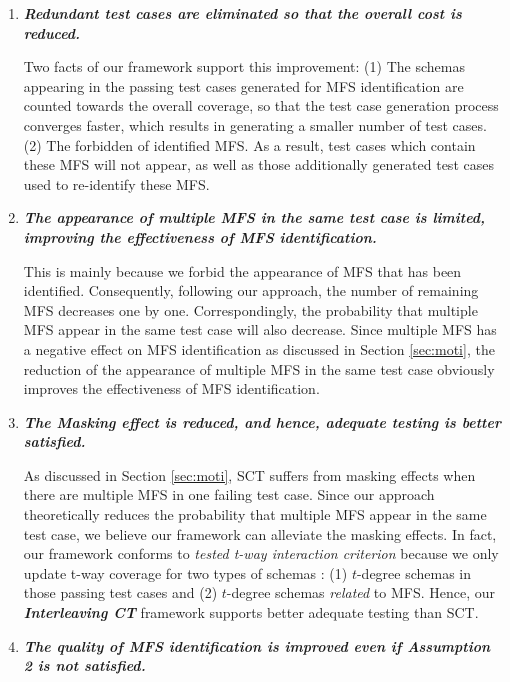 \documentclass[journal,12pt,onecolumn,draftclsnofoot,]{IEEEtran}
\begin{document}
 \begin{enumerate}
\item \emph{\textbf{Redundant test cases are eliminated so that the overall cost is reduced.}}

Two facts of our framework support this improvement: (1) The schemas appearing in the passing test cases generated for MFS identification are counted towards the overall coverage, so that the test case generation process converges faster, which results in generating a smaller number of test cases. (2) The forbidden of identified MFS. As a result, test cases which contain these MFS will not appear, as well as those additionally generated test cases used to re-identify these MFS.

\item \emph{\textbf{The appearance of multiple MFS in the same test case is limited, improving the effectiveness of MFS identification.}}

This is mainly because we forbid the appearance of MFS that has been identified. Consequently, following our approach, the number of remaining MFS decreases one by one. Correspondingly, the probability that multiple MFS appear in the same test case will also decrease. Since multiple MFS has a negative effect on MFS identification as discussed in Section \ref{sec:moti}, the reduction of the appearance of multiple MFS in the same test case obviously improves the effectiveness of MFS identification.

\item \emph{\textbf{The Masking effect is reduced, and hence, adequate testing is better satisfied.}}

As discussed in Section \ref{sec:moti}, SCT suffers from masking effects when there are multiple MFS in one failing test case. Since our approach theoretically reduces the probability that multiple MFS appear in the same test case, we believe our framework can alleviate the masking effects. In fact, our framework conforms to \emph{tested t-way interaction criterion} because we only update t-way coverage for two types of schemas : (1) $t$-degree schemas in those passing test cases and (2) $t$-degree schemas \emph{related} to MFS. Hence, our \emph{\textbf{Interleaving CT}} framework supports better adequate testing than SCT.

\item \emph{\textbf{The quality of MFS identification is improved even if Assumption 2 is not satisfied.}}


\end{enumerate}
\end{document}

